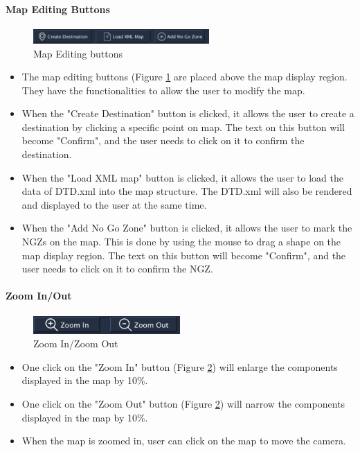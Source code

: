 \documentclass[12pt,a4paper]{article}
\begin{document}
\paragraph{Map Editing Buttons}\label{MAPEDITING} 
\begin{figure}[!htb]
\centering
\includegraphics[width=0.6\textwidth]{MapEditing}
\caption{Map Editing buttons}
\label{map editing buttons} 
\end{figure}
\begin{itemize}
\item The map editing buttons (Figure \ref{map editing buttons} are placed above the map display region. They have the functionalities to allow the user to modify the map.
\item When the "Create Destination"  button is clicked, it allows the user to create a destination by clicking a specific point on map. The text on this button will become "Confirm", and the user needs to click on it to confirm the destination.
\item When the "Load XML map"  button is clicked, it allows the user to load the data of DTD.xml into the map structure. The DTD.xml will also be rendered and displayed to the user at the same time.
\item When the "Add No Go Zone"  button is clicked, it allows the user to mark the NGZs on the map. This is done by using the mouse to drag a shape on the map display region. The text on this button will become "Confirm", and the user needs to click on it to confirm the NGZ.
\end{itemize}

\paragraph{Zoom In/Out} \label{ZOOM}
\begin{figure}[!htb]
\centering
\includegraphics[width=0.5\textwidth]{Zoom}
\caption{Zoom In/Zoom Out}
\label{zoom}
\end{figure}

\begin{itemize} 
\item One click on the "Zoom In" button (Figure \ref{zoom}) will enlarge the components displayed in the map by 10\%. 
\item One click on the "Zoom Out" button (Figure \ref{zoom}) will narrow the components displayed in the map by 10\%.
\item When the map is zoomed in, user can click on the map to move the camera.
\end{itemize}
\end{document}
